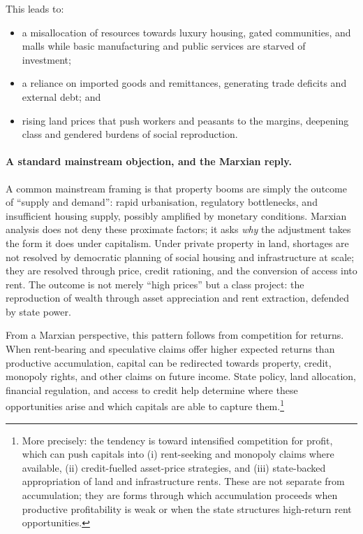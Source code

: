 This leads to:

\begin{itemize}[leftmargin=1.5em]
  \item a misallocation of resources towards luxury housing, gated
  communities, and malls while basic manufacturing and public services are
  starved of investment;
  \item a reliance on imported goods and remittances, generating trade
  deficits and external debt; and
  \item rising land prices that push workers and peasants to the margins,
  deepening class and gendered burdens of social reproduction.
\end{itemize}

\paragraph{A standard mainstream objection, and the Marxian reply.}
A common mainstream framing is that property booms are simply the outcome of ``supply and demand'': rapid
urbanisation, regulatory bottlenecks, and insufficient housing supply, possibly amplified by monetary
conditions. Marxian analysis does not deny these proximate factors; it asks \emph{why} the adjustment takes
the form it does under capitalism. Under private property in land, shortages are not resolved by democratic
planning of social housing and infrastructure at scale; they are resolved through price, credit rationing,
and the conversion of access into rent. The outcome is not merely ``high prices'' but a class project: the
reproduction of wealth through asset appreciation and rent extraction, defended by state power.

From a Marxian perspective, this pattern follows from competition for returns.
When rent-bearing and speculative claims offer higher expected returns than
productive accumulation, capital can be redirected towards property, credit,
monopoly rights, and other claims on future income. State policy, land
allocation, financial regulation, and access to credit help determine where
these opportunities arise and which capitals are able to capture them.\footnote{More precisely: the tendency is toward intensified competition for profit, which can push capitals into (i) rent-seeking and monopoly claims where available, (ii) credit-fuelled asset-price strategies, and (iii) state-backed appropriation of land and infrastructure rents. These are not separate from accumulation; they are forms through which accumulation proceeds when productive profitability is weak or when the state structures high-return rent opportunities.}

